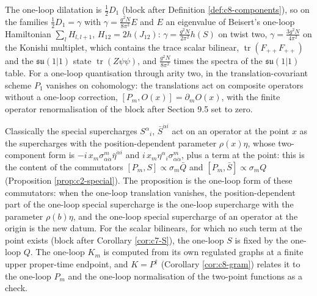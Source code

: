\begin{remark}
The one-loop dilatation is $\tfrac12D_1$ (block after Definition \ref{def:c8-components}), so on the families $\tfrac12D_1=\gamma$ with $\gamma=\frac{g^2N}{8\pi^2}E$ and $E$ an eigenvalue of Beisert's one-loop Hamiltonian $\sum_lH_{l,l+1}$, $H_{12}=2h(J_{12})$: $\gamma=\frac{g^2N}{2\pi^2}h(S)$ on twist two, $\gamma=\frac{3g^2N}{4\pi^2}$ on the Konishi multiplet, which contains the trace scalar bilinear, $\operatorname{tr}(F_{++}F_{++})$ and the $\mathfrak{su}(1|1)$ state $\operatorname{tr}(Z\psi\psi)$, and $\frac{g^2N}{8\pi^2}$ times the spectra of the $\mathfrak{su}(1|1)$ table. For a one-loop quantisation through arity two, in the translation-covariant scheme $P_1$ vanishes on cohomology: the translations act on composite operators without a one-loop correction, $[P_m,O(x)]=\partial_mO(x)$, with the finite operator renormalisation of the block after Section 9.5 set to zero.
\end{remark}

\begin{remark}
Classically the special supercharges $S^\alpha{}_i$, $\bar S^{\dot\alpha i}$ act on an operator at the point $x$ as the supercharges with the position-dependent parameter $\rho(x)\eta$, whose two-component form is $-i\,x_m\sigma^m_{\alpha\dot\alpha}\bar\eta^{\dot\alpha i}$ and $i\,x_m\eta^\alpha{}_i\sigma^m_{\alpha\dot\alpha}$, plus a term at the point: this is the content of the commutators $[P_m,S]\propto\sigma_m\bar Q$ and $[P_m,\bar S]\propto\sigma_mQ$ (Proposition \ref{prop:c2-special}). The proposition is the one-loop form of these commutators: when the one-loop translation vanishes, the position-dependent part of the one-loop special supercharge is the one-loop supercharge with the parameter $\rho(b)\eta$, and the one-loop special supercharge of an operator at the origin is the new datum. For the scalar bilinears, for which no such term at the point exists (block after Corollary \ref{cor:c7-S}), the one-loop $S$ is fixed by the one-loop $Q$. The one-loop $K_m$ is computed from its own regulated graphs at a finite upper proper-time endpoint, and $K=P^\dagger$ (Corollary \ref{cor:c8-gram}) relates it to the one-loop $P_m$ and the one-loop normalisation of the two-point functions as a check.
\end{remark}

